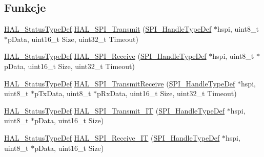 \subsection*{Funkcje}
\begin{DoxyCompactItemize}
\item 
\hyperlink{stm32f4xx__hal__def_8h_a63c0679d1cb8b8c684fbb0632743478f}{H\+A\+L\+\_\+\+Status\+Type\+Def} \hyperlink{group___s_p_i___exported___functions___group2_ga02ec86e05d0702387c221f90b6f041a2}{H\+A\+L\+\_\+\+S\+P\+I\+\_\+\+Transmit} (\hyperlink{group___s_p_i___exported___types_gab3bd115785297692c125528b7293566b}{S\+P\+I\+\_\+\+Handle\+Type\+Def} $\ast$hspi, uint8\+\_\+t $\ast$p\+Data, uint16\+\_\+t Size, uint32\+\_\+t Timeout)
\item 
\hyperlink{stm32f4xx__hal__def_8h_a63c0679d1cb8b8c684fbb0632743478f}{H\+A\+L\+\_\+\+Status\+Type\+Def} \hyperlink{group___s_p_i___exported___functions___group2_gafdf43dbe4e5ef225bed6650b6e8c6313}{H\+A\+L\+\_\+\+S\+P\+I\+\_\+\+Receive} (\hyperlink{group___s_p_i___exported___types_gab3bd115785297692c125528b7293566b}{S\+P\+I\+\_\+\+Handle\+Type\+Def} $\ast$hspi, uint8\+\_\+t $\ast$p\+Data, uint16\+\_\+t Size, uint32\+\_\+t Timeout)
\item 
\hyperlink{stm32f4xx__hal__def_8h_a63c0679d1cb8b8c684fbb0632743478f}{H\+A\+L\+\_\+\+Status\+Type\+Def} \hyperlink{group___s_p_i___exported___functions___group2_ga7c3106fe01493a33b08e5c617f45aeb1}{H\+A\+L\+\_\+\+S\+P\+I\+\_\+\+Transmit\+Receive} (\hyperlink{group___s_p_i___exported___types_gab3bd115785297692c125528b7293566b}{S\+P\+I\+\_\+\+Handle\+Type\+Def} $\ast$hspi, uint8\+\_\+t $\ast$p\+Tx\+Data, uint8\+\_\+t $\ast$p\+Rx\+Data, uint16\+\_\+t Size, uint32\+\_\+t Timeout)
\item 
\hyperlink{stm32f4xx__hal__def_8h_a63c0679d1cb8b8c684fbb0632743478f}{H\+A\+L\+\_\+\+Status\+Type\+Def} \hyperlink{group___s_p_i___exported___functions___group2_gafbb309aa738bb3296934fb1a39ffbf40}{H\+A\+L\+\_\+\+S\+P\+I\+\_\+\+Transmit\+\_\+\+IT} (\hyperlink{group___s_p_i___exported___types_gab3bd115785297692c125528b7293566b}{S\+P\+I\+\_\+\+Handle\+Type\+Def} $\ast$hspi, uint8\+\_\+t $\ast$p\+Data, uint16\+\_\+t Size)
\item 
\hyperlink{stm32f4xx__hal__def_8h_a63c0679d1cb8b8c684fbb0632743478f}{H\+A\+L\+\_\+\+Status\+Type\+Def} \hyperlink{group___s_p_i___exported___functions___group2_gaaae0af2e2db7e7549b52b020a18f6168}{H\+A\+L\+\_\+\+S\+P\+I\+\_\+\+Receive\+\_\+\+IT} (\hyperlink{group___s_p_i___exported___types_gab3bd115785297692c125528b7293566b}{S\+P\+I\+\_\+\+Handle\+Type\+Def} $\ast$hspi, uint8\+\_\+t $\ast$p\+Data, uint16\+\_\+t Size)

\end{DoxyCompactItemize}
